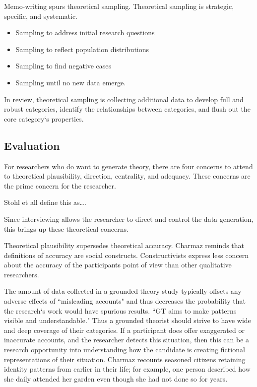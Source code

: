 Memo-writing spurs theoretical sampling. Theoretical sampling is strategic, specific, and systematic.

\begin{itemize}
\item Sampling to address initial research questions 
\item Sampling to reflect population distributions
\item Sampling to find negative cases
\item Sampling until no new data emerge.
\end{itemize}


In review, theoretical sampling is collecting additional data to develop full and robust categories, identify the relationships between categories, and flush out the core category`s properties.

\subsection{Evaluation}
For researchers who do want to generate theory, there are four concerns to attend to theoretical plausibility, direction, centrality, and adequacy. These concerns are the prime concern for the researcher.

Stohl et all define this as….

Since interviewing allows the researcher to direct and control the data generation, this brings up these theoretical concerns. 

Theoretical plausibility supersedes theoretical accuracy. Charmaz reminds that definitions of accuracy are social constructs. Constructivists express less concern about the accuracy of the participants point of view than other qualitative researchers.

The amount of data collected in a grounded theory study typically offsets any adverse effects of ``misleading accounts" and thus decreases the probability that the research`s work would have spurious results. ``GT aims to make patterns visible and understandable." Thus a grounded theorist should strive to have wide and deep coverage of their categories. 
If a participant does offer exaggerated or inaccurate accounts, and the researcher detects this situation, then this can be a research opportunity into understanding how the candidate is creating fictional representations of their situation. Charmaz recounts seasoned citizens retaining identity patterns from earlier in their life; for example, one person described how she daily attended her garden even though she had not done so for years.

